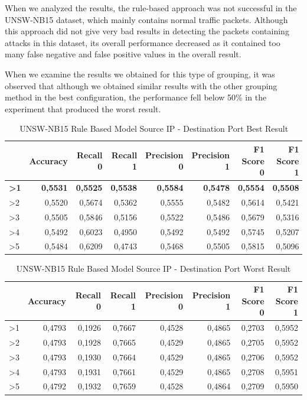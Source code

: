\documentclass{article}
\begin{document}
When we analyzed the results, the rule-based approach was not successful in the UNSW-NB15 dataset, which mainly contains normal traffic packets. Although this approach did not give very bad results in detecting the packets containing attacks in this dataset, its overall performance decreased as it contained too many false negative and false positive values in the overall result.

When we examine the results we obtained for this type of grouping, it was observed that although we obtained similar results with the other grouping method in the best configuration, the performance fell below 50\% in the experiment that produced the worst result.

\begin{table}
  \centering
  \caption{UNSW-NB15 Rule Based Model Source IP - Destination Port Best Result}
  \label{unswnb15-rule-based-src-ip-dst-port-best}
  \begin{tabular}{lrrrrrrr}
    \toprule
	{Rule & Accuracy & Recall 0 & Recall 1 & Precision 0 & Precision 1 & F1 Score 0 & F1 Score 1} \\
	\midrule
        \textbf{>1} & \textbf{0,5531} & \textbf{0,5525} & \textbf{0,5538} & \textbf{0,5584} & \textbf{0,5478} & \textbf{0,5554} & \textbf{0,5508} \\ \hline
        >2 & 0,5520 & 0,5674 & 0,5362 & 0,5555 & 0,5482 & 0,5614 & 0,5421 \\ \hline
        >3 & 0,5505 & 0,5846 & 0,5156 & 0,5522 & 0,5486 & 0,5679 & 0,5316 \\ \hline
        >4 & 0,5492 & 0,6023 & 0,4950 & 0,5492 & 0,5492 & 0,5745 & 0,5207 \\ \hline
        >5 & 0,5484 & 0,6209 & 0,4743 & 0,5468 & 0,5505 & 0,5815 & 0,5096 \\
	\bottomrule
  \end{tabular}
\end{table}

\begin{table}
  \centering
  \caption{UNSW-NB15 Rule Based Model Source IP - Destination Port Worst Result}
  \label{unswnb15-rule-based-src-ip-dst-port-worst}
  \begin{tabular}{lrrrrrrr}
    \toprule
	{Rule & Accuracy & Recall 0 & Recall 1 & Precision 0 & Precision 1 & F1 Score 0 & F1 Score 1} \\
	\midrule
        >1 & 0,4793 & 0,1926 & 0,7667 & 0,4528 & 0,4865 & 0,2703 & 0,5952 \\ \hline
        >2 & 0,4793 & 0,1928 & 0,7665 & 0,4529 & 0,4865 & 0,2705 & 0,5952 \\ \hline
        >3 & 0,4793 & 0,1930 & 0,7664 & 0,4529 & 0,4865 & 0,2706 & 0,5952 \\ \hline
        >4 & 0,4793 & 0,1931 & 0,7661 & 0,4529 & 0,4865 & 0,2708 & 0,5951 \\ \hline
        >5 & 0,4792 & 0,1932 & 0,7659 & 0,4528 & 0,4864 & 0,2709 & 0,5950 \\ 
	\bottomrule
  \end{tabular}
\end{table}
\end{document}
